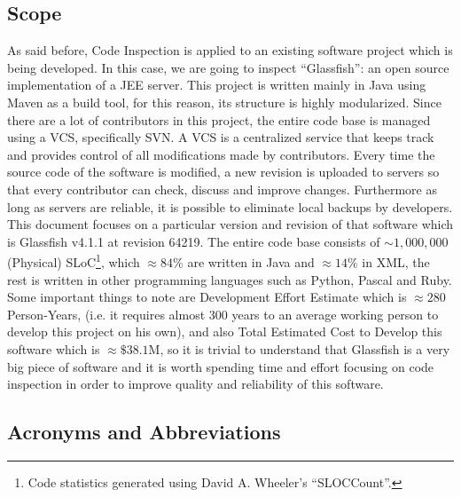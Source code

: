 \subsection{Scope}
As said before, Code Inspection is applied to an existing software project which is being developed. In this case, we are going to inspect ``Glassfish'': an open source implementation of a JEE server.
This project is written mainly in Java using Maven as a build tool, for this reason, its structure is highly modularized. \newline
Since there are a lot of contributors in this project, the entire code base is managed using a VCS, specifically SVN. A VCS is a centralized service that keeps track and provides control of all modifications made by contributors. Every time the source code of the software is modified, a new revision is uploaded to servers so that every contributor can check, discuss and improve changes.
Furthermore as long as servers are reliable, it is possible to eliminate local backups by developers.\newline
This document focuses on a particular version and revision of that software which is Glassfish v4.1.1 at revision 64219.
The entire code base consists of $\sim 1,000,000$ (Physical) SLoC\footnote{Code statistics generated using David A. Wheeler's ``SLOCCount''.}, which $\approx 84\%$ are written in Java and $\approx14\%$ in XML, the rest is written in other programming languages such as Python, Pascal and Ruby. Some important things to note are Development Effort Estimate which is $\approx 280$ Person-Years, (i.e. it requires almost 300 years to an average working person to develop this project on his own), and also Total Estimated Cost to Develop this software which is $\approx \$38.1$M, so it is trivial to understand that Glassfish is a very big piece of software and it is worth spending time and effort focusing on code inspection in order to improve quality and reliability of this software. 
\subsection{Acronyms and Abbreviations}
